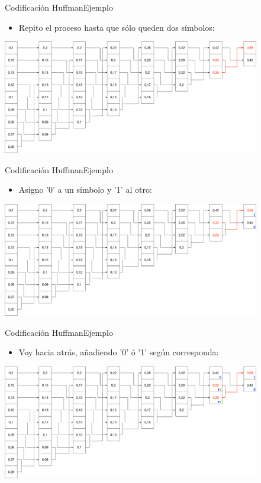 \documentclass[10pt,compress]{beamer} %
\begin{document}
\begin{frame}{Codificación Huffman}{Ejemplo}
  \begin{itemize}
    \item Repito el proceso hasta que sólo queden dos símbolos:
  \end{itemize}
  \centering \includegraphics[height=5cm]{./Figuras/Huffman7.pdf}
\end{frame}

\begin{frame}{Codificación Huffman}{Ejemplo}
  \begin{itemize}
    \item Asigno '0' a un símbolo y '1' al otro:
  \end{itemize}
  \centering \includegraphics[height=5cm]{./Figuras/Huffman8.pdf}
\end{frame}

\begin{frame}{Codificación Huffman}{Ejemplo}
  \begin{itemize}
    \item Voy hacia atrás, añadiendo '0' ó '1' según corresponda:
  \end{itemize}
  \centering \includegraphics[height=5cm]{./Figuras/Huffman9.pdf}
\end{frame}
\end{document}

